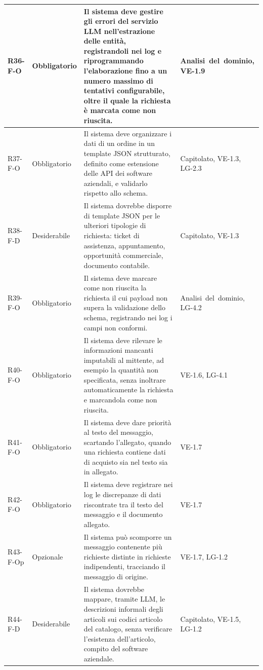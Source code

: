 {\begin{longtable}{|>{\raggedright\arraybackslash}p{1.8cm}|>{\raggedright\arraybackslash}p{2.3cm}|>{\raggedright\arraybackslash}p{6.6cm}|>{\raggedright\arraybackslash}p{3.1cm}|}
    \mbox{R36-F-O} & Obbligatorio & Il sistema deve gestire gli errori del servizio LLM nell'estrazione delle entità, registrandoli nei log e riprogrammando l'elaborazione fino a un numero massimo di tentativi configurabile, oltre il quale la richiesta è marcata come non riuscita. & \mbox{Analisi del dominio}, \mbox{VE-1.9} \\ \hline
    \mbox{R37-F-O} & Obbligatorio & Il sistema deve organizzare i dati di un ordine in un template JSON strutturato, definito come estensione delle API dei software aziendali, e validarlo rispetto allo schema. & \mbox{Capitolato}, \mbox{VE-1.3}, \mbox{LG-2.3} \\ \hline
    \mbox{R38-F-D} & Desiderabile & Il sistema dovrebbe disporre di template JSON per le ulteriori tipologie di richiesta: ticket di assistenza, appuntamento, opportunità commerciale, documento contabile. & \mbox{Capitolato}, \mbox{VE-1.3} \\ \hline
    \mbox{R39-F-O} & Obbligatorio & Il sistema deve marcare come non riuscita la richiesta il cui payload non supera la validazione dello schema, registrando nei log i campi non conformi. & \mbox{Analisi del dominio}, \mbox{LG-4.2} \\ \hline
    \mbox{R40-F-O} & Obbligatorio & Il sistema deve rilevare le informazioni mancanti imputabili al mittente, ad esempio la quantità non specificata, senza inoltrare automaticamente la richiesta e marcandola come non riuscita. & \mbox{VE-1.6}, \mbox{LG-4.1} \\ \hline
    \mbox{R41-F-O} & Obbligatorio & Il sistema deve dare priorità al testo del messaggio, scartando l'allegato, quando una richiesta contiene dati di acquisto sia nel testo sia in allegato. & \mbox{VE-1.7} \\ \hline
    \mbox{R42-F-O} & Obbligatorio & Il sistema deve registrare nei log le discrepanze di dati riscontrate tra il testo del messaggio e il documento allegato. & \mbox{VE-1.7} \\ \hline
    \mbox{R43-F-Op} & Opzionale & Il sistema può scomporre un messaggio contenente più richieste distinte in richieste indipendenti, tracciando il messaggio di origine. & \mbox{VE-1.7}, \mbox{LG-1.2} \\ \hline
    \mbox{R44-F-D} & Desiderabile & Il sistema dovrebbe mappare, tramite LLM, le descrizioni informali degli articoli sui codici articolo del catalogo, senza verificare l'esistenza dell'articolo, compito del software aziendale. & \mbox{Capitolato}, \mbox{VE-1.5}, \mbox{LG-1.2} \\ \hline

\end{longtable}}
